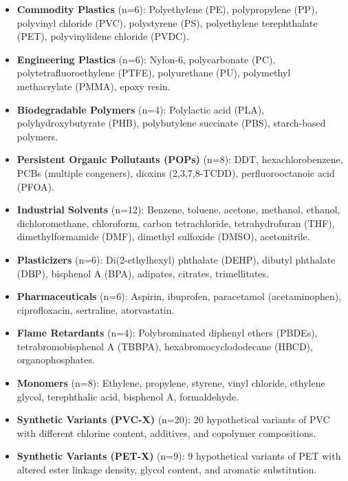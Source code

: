 \documentclass[11pt,letterpaper]{article}
\begin{document}
\begin{itemize}
    \item \textbf{Commodity Plastics} (n=6): Polyethylene (PE), polypropylene (PP), polyvinyl chloride (PVC), polystyrene (PS), polyethylene terephthalate (PET), polyvinylidene chloride (PVDC).
    \item \textbf{Engineering Plastics} (n=6): Nylon-6, polycarbonate (PC), polytetrafluoroethylene (PTFE), polyurethane (PU), polymethyl methacrylate (PMMA), epoxy resin.
    \item \textbf{Biodegradable Polymers} (n=4): Polylactic acid (PLA), polyhydroxybutyrate (PHB), polybutylene succinate (PBS), starch-based polymers.
    \item \textbf{Persistent Organic Pollutants (POPs)} (n=8): DDT, hexachlorobenzene, PCBs (multiple congeners), dioxins (2,3,7,8-TCDD), perfluorooctanoic acid (PFOA).
    \item \textbf{Industrial Solvents} (n=12): Benzene, toluene, acetone, methanol, ethanol, dichloromethane, chloroform, carbon tetrachloride, tetrahydrofuran (THF), dimethylformamide (DMF), dimethyl sulfoxide (DMSO), acetonitrile.
    \item \textbf{Plasticizers} (n=6): Di(2-ethylhexyl) phthalate (DEHP), dibutyl phthalate (DBP), bisphenol A (BPA), adipates, citrates, trimellitates.
    \item \textbf{Pharmaceuticals} (n=6): Aspirin, ibuprofen, paracetamol (acetaminophen), ciprofloxacin, sertraline, atorvastatin.
    \item \textbf{Flame Retardants} (n=4): Polybrominated diphenyl ethers (PBDEs), tetrabromobisphenol A (TBBPA), hexabromocyclododecane (HBCD), organophosphates.
    \item \textbf{Monomers} (n=8): Ethylene, propylene, styrene, vinyl chloride, ethylene glycol, terephthalic acid, bisphenol A, formaldehyde.
    \item \textbf{Synthetic Variants (PVC-X)} (n=20): 20 hypothetical variants of PVC with different chlorine content, additives, and copolymer compositions.
    \item \textbf{Synthetic Variants (PET-X)} (n=9): 9 hypothetical variants of PET with altered ester linkage density, glycol content, and aromatic substitution.
\end{itemize}
\end{document}
